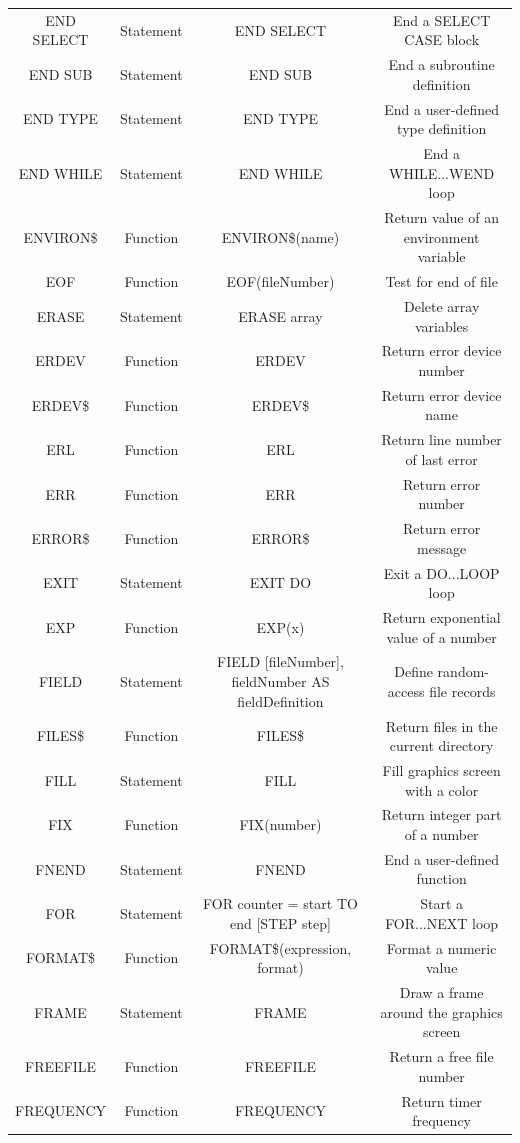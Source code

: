 \documentclass[10pt, reqno]{exam}
\begin{document}
{\begin{longtable}{|c|c|c|c|}
    END SELECT & Statement & END SELECT & End a SELECT CASE block \\
    END SUB & Statement & END SUB & End a subroutine definition \\
    END TYPE & Statement & END TYPE & End a user-defined type definition \\
    END WHILE & Statement & END WHILE & End a WHILE...WEND loop \\
    ENVIRON\$ & Function & ENVIRON\$(name) & Return value of an environment variable \\
    EOF & Function & EOF(fileNumber) & Test for end of file \\
    ERASE & Statement & ERASE array & Delete array variables \\
    ERDEV & Function & ERDEV & Return error device number \\
    ERDEV\$ & Function & ERDEV\$ & Return error device name \\
    ERL & Function & ERL & Return line number of last error \\
    ERR & Function & ERR & Return error number \\
    ERROR\$ & Function & ERROR\$ & Return error message \\
    EXIT & Statement & EXIT DO & Exit a DO...LOOP loop \\
    EXP & Function & EXP(x) & Return exponential value of a number \\
    FIELD & Statement & FIELD [fileNumber], fieldNumber AS fieldDefinition & Define random-access file records \\
    FILES\$ & Function & FILES\$ & Return files in the current directory \\
    FILL & Statement & FILL & Fill graphics screen with a color \\
    FIX & Function & FIX(number) & Return integer part of a number \\
    FNEND & Statement & FNEND & End a user-defined function \\
    FOR & Statement & FOR counter = start TO end [STEP step] & Start a FOR...NEXT loop \\
    FORMAT\$ & Function & FORMAT\$(expression, format) & Format a numeric value \\
    FRAME & Statement & FRAME & Draw a frame around the graphics screen \\
    FREEFILE & Function & FREEFILE & Return a free file number \\
    FREQUENCY & Function & FREQUENCY & Return timer frequency \\

\end{longtable}}
\end{document}
